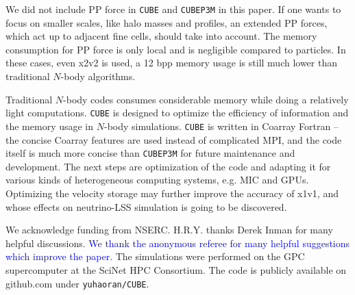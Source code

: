 \documentclass[10pt,twocolumn,preprint]{emulateapj}
\newcommand{\tcb}{\textcolor{blue}}
\begin{document}
We did not include PP force in {\tt CUBE} and {\tt CUBEP3M} in this paper. If one wants to focus on smaller scales, like halo masses and profiles, an extended PP forces, which act up to adjacent fine cells, should take into account. The memory consumption for PP force is only local and is negligible compared to particles. In these cases, even x2v2 is used, a 12 bpp memory usage is still much lower than traditional $N$-body algorithms.

Traditional $N$-body codes consumes considerable memory while doing a relatively light computations. {\tt CUBE} is designed to optimize the efficiency of information and the memory usage in $N$-body simulations. {\tt CUBE} is written in Coarray Fortran -- the concise Coarray features are used instead of complicated MPI, and the code itself is much more concise than {\tt CUBEP3M} for future maintenance and development. The next steps are optimization of the code and adapting it for various kinds of heterogeneous computing systems, e.g. MIC and GPUs. Optimizing the velocity storage may further improve the accuracy of x1v1, and whose effects on neutrino-LSS simulation is going to be discovered.

\acknowledgements
We acknowledge funding from NSERC.
H.R.Y. thanks Derek Inman for many helpful discussions. \tcb{We thank the anonymous referee for many helpful suggestions which improve the paper.}
The simulations were performed on the GPC supercomputer at the SciNet HPC Consortium.
The code is publicly available on github.com under {\tt yuhaoran/CUBE}.



\end{document}
